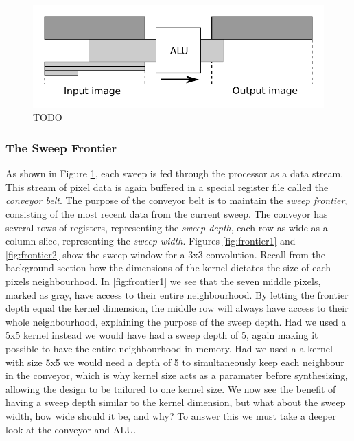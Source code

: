 \begin{figure}[h!]
    \includegraphics[width=\linewidth]{img/daisy_processing.pdf}
    \caption{TODO}
    \label{fig:sweep_feed}
\end{figure}

\subsubsection{The Sweep Frontier}
As shown in Figure \ref{fig:sweep_feed}, each sweep is fed through the processor as a data stream.
This stream of pixel data is again buffered in a special register file called the \textit{conveyor belt}.
The purpose of the conveyor belt is to maintain the \textit{sweep frontier}, consisting of the most recent data from the current sweep.
The conveyor has several rows of registers, representing the \textit{sweep depth}, each row as wide as a column slice, representing the \textit{sweep width}.
Figures \ref{fig:frontier1} and \ref{fig:frontier2} show the sweep window for a 3x3 convolution.
Recall from the background section how the dimensions of the kernel dictates the size of each pixels neighbourhood.
In \ref{fig:frontier1} we see that the seven middle pixels, marked as gray, have access to their entire neighbourhood.
By letting the frontier depth equal the kernel dimension, the middle row will always have access to their whole neighbourhood, explaining the purpose of the sweep depth.
Had we used a 5x5 kernel instead we would have had a sweep depth of 5, again making it possible to have the entire neighbourhood in memory.
Had we used a a kernel with size 5x5 we would need a depth of 5 to simultaneously keep each neighbour in the conveyor, which is why kernel size acts as a paramater before synthesizing, allowing the design to be tailored to one kernel size.
We now see the benefit of having a sweep depth similar to the kernel dimension, but what about the sweep width, how wide should it be, and why?
To answer this we must take a deeper look at the conveyor and ALU.
\clearpage
